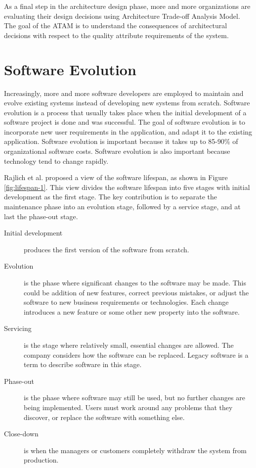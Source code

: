 {As a final step in the architecture design phase, more and more organizations are evaluating their design decisions using Architecture Trade-off Analysis Model\cite{Bass:2012:SAP:2392670,sherman2008quality}. The goal of the ATAM is to understand the consequences of architectural decisions with respect to the quality attribute requirements of the system.







\section{Software Evolution}
\label{sec:2-SE}
Increasingly, more and more software developers are employed to maintain and evolve existing systems instead of developing new systems from scratch\cite{Sommerville:2011:SE}. Software evolution is a process that usually takes place when the initial development of a software project is done and was successful\cite{Bennett:2000:SME:336512.336534}. The goal of software evolution is to incorporate new user requirements in the application, and adapt it to the existing application. Software evolution is important because it takes up to 85-90\% of organizational software costs\cite{Sommerville:2011:SE}. Software evolution is also important because technology tend to change rapidly.

Rajlich et al.\cite{Bennett:2000:SME:336512.336534} proposed a view of the software lifespan, as shown in Figure \ref{fig:lifespan-1}. This view divides the software lifespan into five stages with initial development as the first stage. The key contribution is to separate the maintenance phase into an evolution stage, followed by a service stage, and at last the phase-out stage.
\begin{description}
	\item[Initial development] produces the first version of the software from scratch.
	\item[Evolution] is the phase where significant changes to the software may be made. This could be addition of new features, correct previous mistakes, or adjust the software to new business requirements or technologies. Each change introduces a new feature or some other new property into the software.
	\item[Servicing] is the stage where relatively small, essential changes are allowed. The company considers how the software can be replaced. Legacy software is a term to describe software in this stage.
	\item[Phase-out] is the phase where software may still be used, but no further changes are being implemented. Users must work around any problems that they discover, or replace the software with something else.
	\item[Close-down] is when the managers or customers completely withdraw the system from production.
\end{description} 

}
